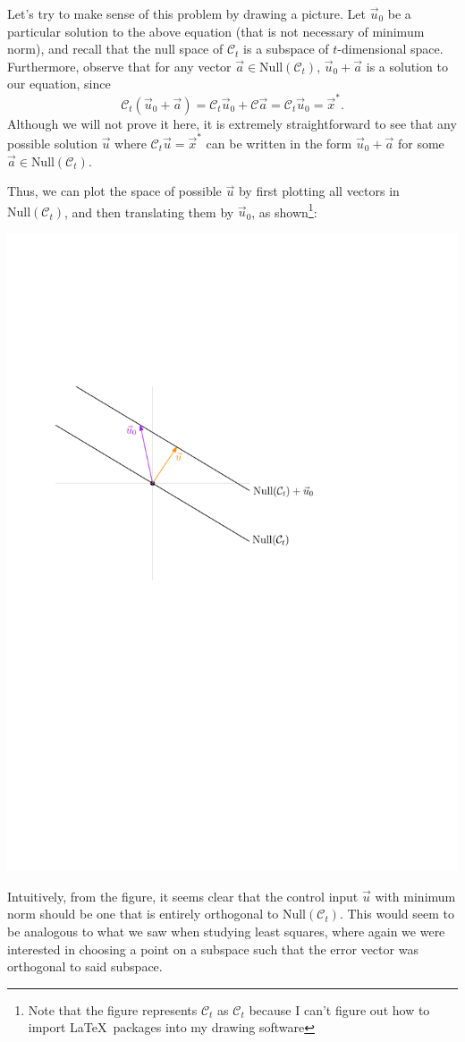 \documentclass[letterpaper]{article}
\theoremstyle{remark}
\newcommand{\Null}[1]{\text{Null}(#1)}
\begin{document}
Let's try to make sense of this problem by drawing a picture. Let $\vec{u}_0$ be a particular solution to the above equation (that is not necessary of minimum norm), and recall that the null space of $\mathscr{C}_t$ is a subspace of $t$-dimensional space. Furthermore, observe that for any vector $\vec{a} \in \Null{\mathscr{C}_t}$, $\vec{u}_0 + \vec{a}$ is a solution to our equation, since
\[
    \mathscr{C}_t(\vec{u}_0 + \vec{a}) = \mathscr{C}_t\vec{u}_0 + \mathscr{C}\vec{a} = \mathscr{C}_t\vec{u}_0 = \vec{x}^*.
\]
Although we will not prove it here, it is extremely straightforward to see that any possible solution $\vec{u}$ where $\mathscr{C}_t\vec{u} = \vec{x}^*$ can be written in the form $\vec{u}_0 + \vec{a}$ for some $\vec{a} \in \Null{\mathscr{C}_t}$.

Thus, we can plot the space of possible $\vec{u}$ by first plotting all vectors in $\Null{\mathscr{C}_t}$, and then translating them by $\vec{u}_0$, as shown\footnote{Note that the figure represents $\mathscr{C}_t$ as $\mathcal{C}_t$ because I can't figure out how to import \LaTeX \, packages into my drawing software}:
\begin{center}
    \includegraphics[scale=0.7]{lecture_20/subspaces.pdf}
\end{center}
Intuitively, from the figure, it seems clear that the control input $\vec{u}$ with minimum norm should be one that is entirely orthogonal to $\Null{\mathscr{C}_t}$. This would seem to be analogous to what we saw when studying least squares, where again we were interested in choosing a point on a subspace such that the error vector was orthogonal to said subspace.
\end{document}
